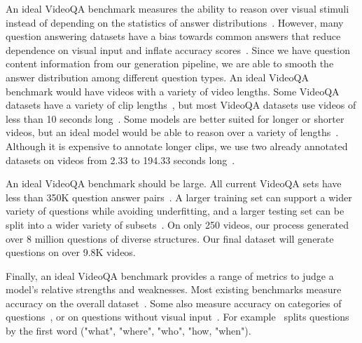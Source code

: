 \documentclass[10pt,twocolumn,letterpaper]{article}
\newcommand{\mgm}[1]{{\color{cyan}{mgm: #1}}}
\begin{document}
An ideal VideoQA benchmark measures the ability to reason over visual stimuli instead of depending on the statistics of answer distributions~\cite{vatashsky2020vqa}. However, many question answering datasets have a bias towards common answers that reduce dependence on visual input and inflate accuracy scores~\cite{goyal2017making, hudson2019gqa}. 
Since we have question content information from our generation pipeline, we are able to smooth the answer distribution among different question types. \mgm{ideally add in numbers about how that makes the blind model worse than blind models on other sets? idk}
An ideal VideoQA benchmark would have videos with a variety of video lengths. Some VideoQA datasets have a variety of clip lengths~\cite{yu2019activitynet,xu2017video}, but most VideoQA datasets use videos of less than 10 seconds long~\cite{jang2017tgif,kim2017deepstory,xu2017video,maharaj2017dataset,zeng2016leveraging,yu2019activitynet}. Some models are better suited for longer or shorter videos, but an ideal model would be able to reason over a variety of lengths~\cite{na2017read,le2020hierarchical}. Although it is expensive to annotate longer clips, we use two already annotated datasets on videos from 2.33 to 194.33 seconds long~\cite{sigurdsson2016hollywood,ji2020action}. \mgm{questionable important this is to talk about lengths of videos}

An ideal VideoQA benchmark should be large. All current VideoQA sets have less than 350K question answer pairs~\cite{jang2017tgif,kim2017deepstory,xu2017video,maharaj2017dataset,zeng2016leveraging,yu2019activitynet,lei2018tvqa,tapaswi2016movieqa}. \mgm{check cleverer} A larger training set can support a wider variety of questions while avoiding underfitting, and a larger testing set can be split into a wider variety of subsets~\cite{maharaj2017dataset}. On only 250 videos, our process generated over 8 million questions of diverse structures. Our final dataset will generate questions on over 9.8K videos. \mgm{no longer as impressively large - probably take out}

Finally, an ideal VideoQA benchmark provides a range of metrics to judge a model's relative strengths and weaknesses. Most existing benchmarks measure accuracy on the overall dataset~\cite{maharaj2017dataset,jang2017tgif,xu2017video,maharaj2017dataset,zeng2016leveraging,yu2019activitynet}. Some also measure accuracy on categories of questions~\cite{jang2017tgif,xu2017video,yu2019activitynet}, or on questions without visual input~\cite{zeng2016leveraging}. For example~\cite{xu2017video} splits questions by the first word ("what", "where", "who", "how, "when"). %
\end{document}
